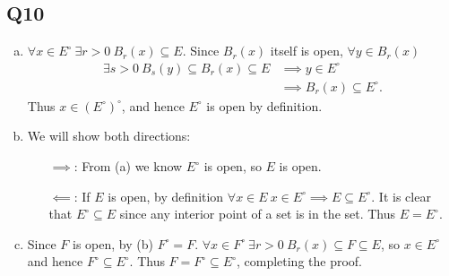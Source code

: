 \documentclass[12pt,lettersize]{article}
\theoremstyle{remark}
\begin{document}
	\subsection*{Q10}
	\begin{enumerate}[(a)]
		\item $\forall x\in E^\circ\ \exists r>0\ B_r(x)\subseteq E$. Since $B_r(x)$ itself is open, $\forall y\in B_r(x)$
		\begin{align*}
			\exists s>0\ B_s(y)\subseteq B_r(x)\subseteq E &\implies y\in E^\circ\\
														   &\implies B_r(x)\subseteq E^\circ.
		\end{align*}
		Thus $x\in(E^\circ)^\circ$, and hence $E^\circ$ is open by definition.
		\item We will show both directions:
		\begin{itemize}
			\item[$\implies$:] From (a) we know $E^\circ$ is open, so $E$ is open.
			\item[$\impliedby$:] If $E$ is open, by definition $\forall x\in E\ x\in E^\circ\implies E\subseteq E^\circ$. It is clear that $E^\circ\subseteq E$ since any interior point of a set is in the set. Thus $E=E^\circ$.
		\end{itemize}
		\item Since $F$ is open, by (b) $F^\circ=F$. $\forall x\in F^\circ\ \exists r>0\ B_r(x)\subseteq F\subseteq E$, so $x\in E^\circ$ and hence $F^\circ\subseteq E^\circ$. Thus $F=F^\circ\subseteq E^\circ$, completing the proof.
	\end{enumerate}
	\newpage
	
\end{document}
